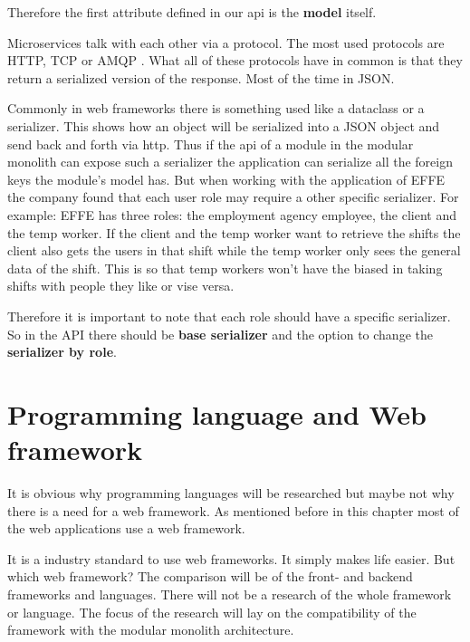 Therefore the first attribute defined in our api is the \textbf{model} itself.

Microservices talk with each other via a protocol. The most used protocols are HTTP, TCP or AMQP \cite{microservicesAPI}. What all of these protocols have in common is that they return a serialized version of the response. Most of the time in JSON.

Commonly in web frameworks there is something used like a dataclass or a serializer. This shows how an object will be serialized into a JSON object and send back and forth via http. Thus if the api of a module in the modular monolith can expose such a serializer the application can serialize all the foreign keys the module's model has. But when working with the application of EFFE the company found that each user role may require a other specific serializer. For example: EFFE has three roles: the employment agency employee, the client and the temp worker. If the client and the temp worker want to retrieve the shifts the client also gets the users in that shift while the temp worker only sees the general data of the shift. This is so that temp workers won't have the biased in taking shifts with people they like or vise versa.

Therefore it is important to note that each role should have a specific serializer. So in the API there should be \textbf{base serializer} and the option to change the \textbf{serializer by role}.

\section{Programming language and Web framework}

It is obvious why programming languages will be researched but maybe not why there is a need for a web framework. As mentioned before in this chapter most of the web applications use a web framework.


It is a industry standard to use web frameworks. It simply makes life easier. But which web framework? The comparison will be of the front- and backend frameworks and languages. There will not be a research of the whole framework or language. The focus of the research will lay on the compatibility of the framework with the modular monolith architecture.

